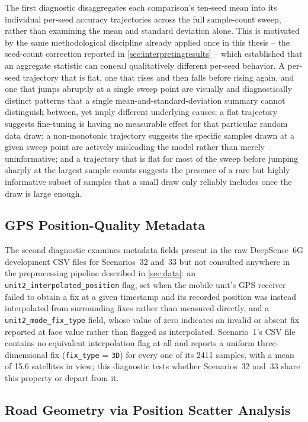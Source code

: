 \documentclass{iutbscthesis}
\begin{document}
The first diagnostic disaggregates each comparison's ten-seed mean into its individual per-seed accuracy trajectories across the full sample-count sweep, rather than examining the mean and standard deviation alone. This is motivated by the same methodological discipline already applied once in this thesis -- the seed-count correction reported in \autoref{sec:interpretingresults} -- which established that an aggregate statistic can conceal qualitatively different per-seed behavior. A per-seed trajectory that is flat, one that rises and then falls before rising again, and one that jumps abruptly at a single sweep point are visually and diagnostically distinct patterns that a single mean-and-standard-deviation summary cannot distinguish between, yet imply different underlying causes: a flat trajectory suggests fine-tuning is having no measurable effect for that particular random data draw; a non-monotonic trajectory suggests the specific samples drawn at a given sweep point are actively misleading the model rather than merely uninformative; and a trajectory that is flat for most of the sweep before jumping sharply at the largest sample counts suggests the presence of a rare but highly informative subset of samples that a small draw only reliably includes once the draw is large enough.

\subsection{GPS Position-Quality Metadata}
\label{sec:stage4gps}

The second diagnostic examines metadata fields present in the raw DeepSense~6G development CSV files for Scenarios~32 and~33 but not consulted anywhere in the preprocessing pipeline described in \autoref{sec:data}: an \texttt{unit2\_interpolated\_position} flag, set when the mobile unit's GPS receiver failed to obtain a fix at a given timestamp and its recorded position was instead interpolated from surrounding fixes rather than measured directly, and a \texttt{unit2\_mode\_fix\_type} field, whose value of zero indicates an invalid or absent fix reported at face value rather than flagged as interpolated. Scenario~1's CSV file contains no equivalent interpolation flag at all and reports a uniform three-dimensional fix (\texttt{fix\_type} = \texttt{3D}) for every one of its 2411 samples, with a mean of 15.6 satellites in view; this diagnostic tests whether Scenarios~32 and~33 share this property or depart from it.

\subsection{Road Geometry via Position Scatter Analysis}
\label{sec:stage4geometry}
\end{document}
